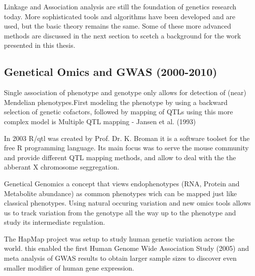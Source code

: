 Linkage and Association analysis are still the foundation of genetics research today. More 
sophisticated tools and algorithms have been developed and are used, but the basic theory 
remains the same. Some of these more advanced methods are discussed in the next section to 
scetch a background for the work presented in this thesis.

\subsection{Genetical Omics and GWAS (2000-2010)}

Single association of phenotype and genotype only allows for detection of (near) Mendelian 
phenotypes.First modeling the phenotype by using a backward selection of genetic cofactors, 
followed by mapping of QTLs using this more complex model is Multiple QTL mapping - Jansen et 
al. (1993)

In 2003 R/qtl was created by Prof. Dr. K. Broman it is a software toolset for the free R 
programming language. Its main focus was to serve the mouse community and provide different QTL 
mapping methods, and allow to deal with the the abberant X chromosome seggregation.

Genetical Genomics a concept that views endophenotypes (RNA, Protein and Metabolite abundance) 
as common phenotypes wich can be mapped just like classical phenotypes. Using natural occuring 
variation and new omics tools allows us to track variation from the genotype all the way up to 
the phenotype and study its intermediate regulation.

The HapMap project was setup to study human genetic variation across the world. this enabled 
the first Human Genome Wide Association Study (2005) and meta analysis of GWAS results to 
obtain larger sample sizes to discover even smaller modifier of human gene expression.


